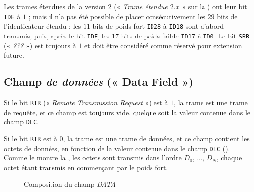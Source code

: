 Les trames étendues de la version 2 (« \emph{Trame étendue $2.x$} » sur la ) ont leur bit \texttt{IDE} à $1$ ; mais il n'a pas été possible de placer consécutivement les $29$ bits de l'identicateur étendu : les $11$ bits de poids fort \texttt{ID28} à \texttt{ID18} sont d'abord transmis, puis, après le bit \texttt{IDE}, les $17$ bits de poids faible \texttt{ID17} à \texttt{ID0}. Le bit \texttt{SRR} (« \emph{???} ») est toujours à $1$  et doit être considéré comme réservé pour extension future.






\subsection{Champ \emph{de données} (« Data Field »)}

Si le bit \texttt{RTR} (« \emph{Remote Transmission Request} ») est à $1$, la trame est une trame de requête, et ce champ est toujours vide, quelque soit la valeur contenue dans le champ \texttt{DLC}.

Si le bit \texttt{RTR} est à $0$, la trame est une trame de données, et ce champ contient les octets de données, en fonction de la valeur contenue dans le champ \texttt{DLC} (). Comme le montre la , les octets sont transmis dans l'ordre \texttt{$D_0$}, ..., \texttt{$D_N$}, chaque octet étant transmis en commençant par le poids fort.



\begin{figure}[h]
  \centering
  \caption{Composition du champ \emph{DATA}}
\end{figure}





